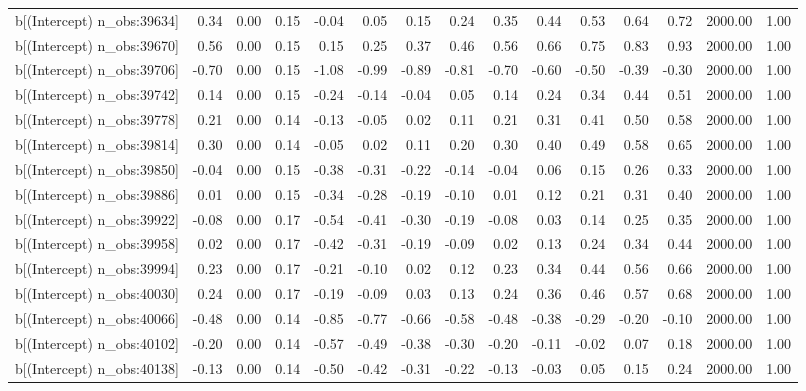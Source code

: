 \begin{table}[ht]
\begin{tabular}{rrrrrrrrrrrrrrr}
  b[(Intercept) n\_obs:39634] & 0.34 & 0.00 & 0.15 & -0.04 & 0.05 & 0.15 & 0.24 & 0.35 & 0.44 & 0.53 & 0.64 & 0.72 & 2000.00 & 1.00 \\ 
  b[(Intercept) n\_obs:39670] & 0.56 & 0.00 & 0.15 & 0.15 & 0.25 & 0.37 & 0.46 & 0.56 & 0.66 & 0.75 & 0.83 & 0.93 & 2000.00 & 1.00 \\ 
  b[(Intercept) n\_obs:39706] & -0.70 & 0.00 & 0.15 & -1.08 & -0.99 & -0.89 & -0.81 & -0.70 & -0.60 & -0.50 & -0.39 & -0.30 & 2000.00 & 1.00 \\ 
  b[(Intercept) n\_obs:39742] & 0.14 & 0.00 & 0.15 & -0.24 & -0.14 & -0.04 & 0.05 & 0.14 & 0.24 & 0.34 & 0.44 & 0.51 & 2000.00 & 1.00 \\ 
  b[(Intercept) n\_obs:39778] & 0.21 & 0.00 & 0.14 & -0.13 & -0.05 & 0.02 & 0.11 & 0.21 & 0.31 & 0.41 & 0.50 & 0.58 & 2000.00 & 1.00 \\ 
  b[(Intercept) n\_obs:39814] & 0.30 & 0.00 & 0.14 & -0.05 & 0.02 & 0.11 & 0.20 & 0.30 & 0.40 & 0.49 & 0.58 & 0.65 & 2000.00 & 1.00 \\ 
  b[(Intercept) n\_obs:39850] & -0.04 & 0.00 & 0.15 & -0.38 & -0.31 & -0.22 & -0.14 & -0.04 & 0.06 & 0.15 & 0.26 & 0.33 & 2000.00 & 1.00 \\ 
  b[(Intercept) n\_obs:39886] & 0.01 & 0.00 & 0.15 & -0.34 & -0.28 & -0.19 & -0.10 & 0.01 & 0.12 & 0.21 & 0.31 & 0.40 & 2000.00 & 1.00 \\ 
  b[(Intercept) n\_obs:39922] & -0.08 & 0.00 & 0.17 & -0.54 & -0.41 & -0.30 & -0.19 & -0.08 & 0.03 & 0.14 & 0.25 & 0.35 & 2000.00 & 1.00 \\ 
  b[(Intercept) n\_obs:39958] & 0.02 & 0.00 & 0.17 & -0.42 & -0.31 & -0.19 & -0.09 & 0.02 & 0.13 & 0.24 & 0.34 & 0.44 & 2000.00 & 1.00 \\ 
  b[(Intercept) n\_obs:39994] & 0.23 & 0.00 & 0.17 & -0.21 & -0.10 & 0.02 & 0.12 & 0.23 & 0.34 & 0.44 & 0.56 & 0.66 & 2000.00 & 1.00 \\ 
  b[(Intercept) n\_obs:40030] & 0.24 & 0.00 & 0.17 & -0.19 & -0.09 & 0.03 & 0.13 & 0.24 & 0.36 & 0.46 & 0.57 & 0.68 & 2000.00 & 1.00 \\ 
  b[(Intercept) n\_obs:40066] & -0.48 & 0.00 & 0.14 & -0.85 & -0.77 & -0.66 & -0.58 & -0.48 & -0.38 & -0.29 & -0.20 & -0.10 & 2000.00 & 1.00 \\ 
  b[(Intercept) n\_obs:40102] & -0.20 & 0.00 & 0.14 & -0.57 & -0.49 & -0.38 & -0.30 & -0.20 & -0.11 & -0.02 & 0.07 & 0.18 & 2000.00 & 1.00 \\ 
  b[(Intercept) n\_obs:40138] & -0.13 & 0.00 & 0.14 & -0.50 & -0.42 & -0.31 & -0.22 & -0.13 & -0.03 & 0.05 & 0.15 & 0.24 & 2000.00 & 1.00 \\ 

\end{tabular}
\end{table}
